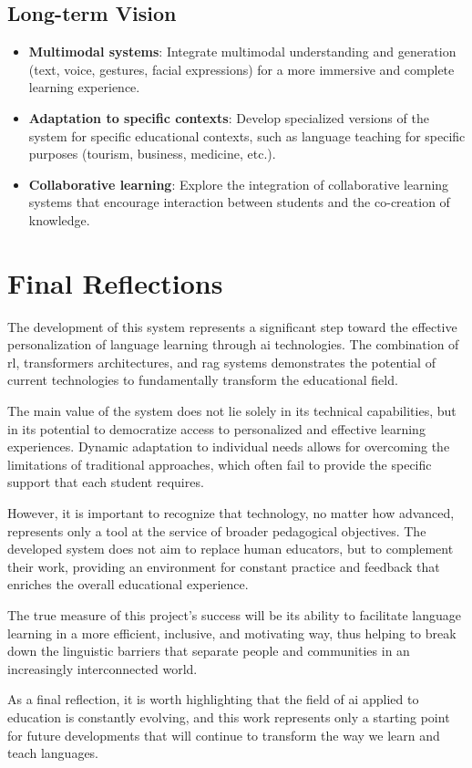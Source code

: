 \subsection{Long-term Vision}
\label{subsec:long-term-vision}

\begin{itemize}
    \item \textbf{Multimodal systems}: Integrate multimodal understanding and generation (text, voice, gestures, facial expressions) for a more immersive and complete learning experience.
    
    \item \textbf{Adaptation to specific contexts}: Develop specialized versions of the system for specific educational contexts, such as language teaching for specific purposes (tourism, business, medicine, etc.).
    
    \item \textbf{Collaborative learning}: Explore the integration of collaborative learning systems that encourage interaction between students and the co-creation of knowledge.
\end{itemize}

\section{Final Reflections}
\label{sec:final-reflections}

The development of this system represents a significant step toward the effective personalization of language learning through \gls{ai} technologies. The combination of \gls{rl}, \gls{transformers} architectures, and \gls{rag} systems demonstrates the potential of current technologies to fundamentally transform the educational field.

The main value of the system does not lie solely in its technical capabilities, but in its potential to democratize access to personalized and effective learning experiences. Dynamic adaptation to individual needs allows for overcoming the limitations of traditional approaches, which often fail to provide the specific support that each student requires.

However, it is important to recognize that technology, no matter how advanced, represents only a tool at the service of broader pedagogical objectives. The developed system does not aim to replace human educators, but to complement their work, providing an environment for constant practice and feedback that enriches the overall educational experience.

The true measure of this project's success will be its ability to facilitate language learning in a more efficient, inclusive, and motivating way, thus helping to break down the linguistic barriers that separate people and communities in an increasingly interconnected world.

As a final reflection, it is worth highlighting that the field of \gls{ai} applied to education is constantly evolving, and this work represents only a starting point for future developments that will continue to transform the way we learn and teach languages.